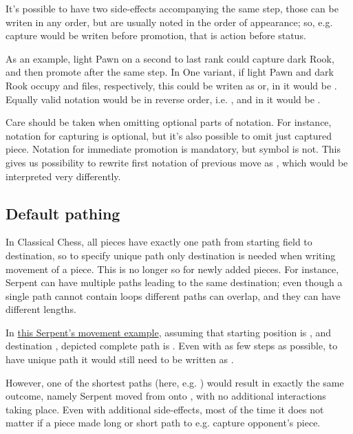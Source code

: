 It's possible to have two side-effects accompanying the same step, those can be
writen in any order, but are usually noted in the order of appearance; so, e.g.
capture would be writen before promotion, that is action before status.

As an example, light Pawn on a second to last rank could capture dark Rook, and
then promote after the same step. In One variant, if light Pawn and dark Rook
occupy  and  files, respectively, this could be writen as
 or, in  it would be . Equally valid
notation would be in reverse order, i.e. , and in  it
would be .

Care should be taken when omitting optional parts of notation. For instance,
notation for capturing is optional, but it's also possible to omit just captured
piece. Notation for immediate promotion is mandatory, but symbol is not. This
gives us possibility to rewrite first notation of previous move as ,
which would be interpreted very differently.

\subsection*{Default pathing}
\label{sec:Appendix/Notation/Default pathing}

In Classical Chess, all pieces have exactly one path from starting field to destination,
so to specify unique path only destination is needed when writing movement of a piece.
This is no longer so for newly added pieces. For instance, Serpent can have multiple
paths leading to the same destination; even though a single path cannot contain loops
different paths can overlap, and they can have different lengths.

In \hyperref[fig:scn_tr_05_serpent_end]{this Serpent's movement example}, assuming that
starting position is , and destination , depicted complete path is
. Even with as few steps as possible, to have unique path
it would still need to be written as .

However, one of the shortest paths (here, e.g. \newline
{}) would result in exactly the same outcome, namely Serpent moved from
 onto , with no additional interactions taking place. Even with additional
side-effects, most of the time it does not matter if a piece made long or short path to e.g.
capture opponent's piece.

